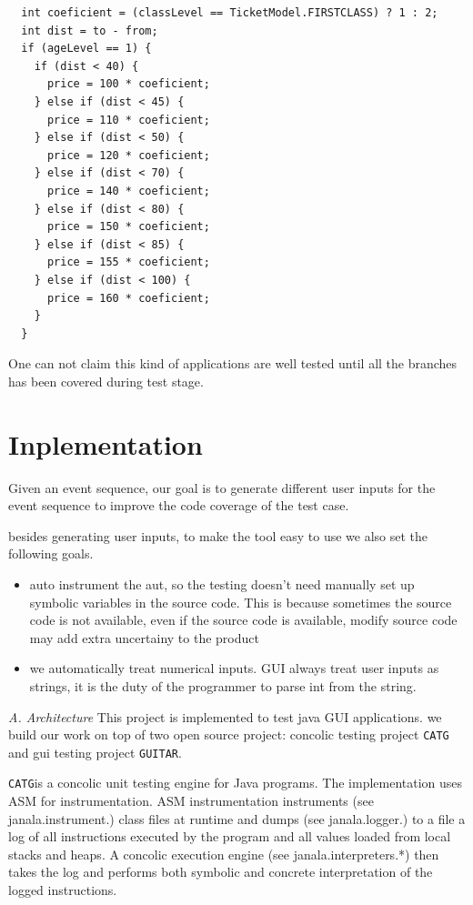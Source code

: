 \documentclass{article}
\begin{document}
\begin{lstlisting}
  int coeficient = (classLevel == TicketModel.FIRSTCLASS) ? 1 : 2;
  int dist = to - from;
  if (ageLevel == 1) {
    if (dist < 40) {
      price = 100 * coeficient;
    } else if (dist < 45) {
      price = 110 * coeficient;
    } else if (dist < 50) {
      price = 120 * coeficient;
    } else if (dist < 70) {
      price = 140 * coeficient;
    } else if (dist < 80) {
      price = 150 * coeficient;
    } else if (dist < 85) {
      price = 155 * coeficient;
    } else if (dist < 100) {
      price = 160 * coeficient;
    }
  }
\end{lstlisting}

One can not claim this kind of applications are well tested until all the branches has been covered during test stage.


\section{Inplementation}


Given an event sequence, our goal is to generate different user inputs for the event sequence to improve the code coverage of the test case.

besides generating user inputs, to make the tool easy to use we also set the following goals.
\begin{itemize}
  \item {auto instrument the aut, so the testing doesn't need manually set up symbolic variables in the source code. This is because sometimes the source code is not available, even if the source code is available, modify source code may add extra uncertainy to the product }
    \item{we automatically treat numerical inputs. GUI always treat user inputs as strings, it is the duty of the programmer to parse int from the string. }
      \end{itemize}



\par{\textit{A. Architecture}}
This project is implemented to test java GUI applications.
we build our work on top of two open source project: concolic testing project  \texttt{CATG} and gui testing project \texttt{GUITAR}.

\texttt{CATG}is a concolic unit testing engine for Java programs. The implementation uses ASM for instrumentation. ASM instrumentation instruments (see janala.instrument.) class files at runtime and dumps (see janala.logger.) to a file a log of all instructions executed by the program and all values loaded from local stacks and heaps. A concolic execution engine (see janala.interpreters.*) then takes the log and performs both symbolic and concrete interpretation of the logged instructions.
\end{document}
